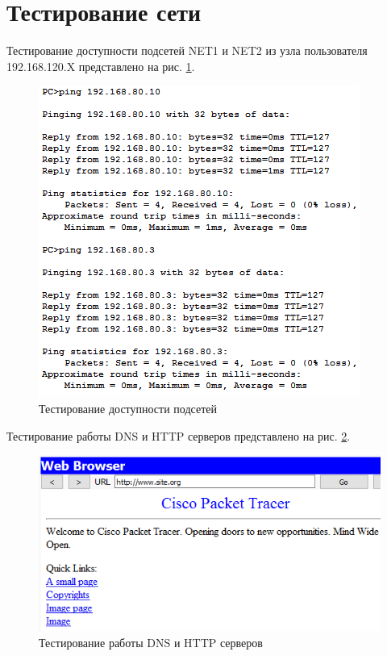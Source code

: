 \section{Тестирование сети}

Тестирование доступности подсетей NET1 и NET2 из узла пользователя 192.168.120.X представлено на рис. \ref{image:6_1}.

\begin{figure}[h!]
	\centering
	\includegraphics[scale = 0.89]{images/6_1.png}
	\caption{Тестирование доступности подсетей}
	\label{image:6_1}
\end{figure}

\clearpage

Тестирование работы DNS и HTTP серверов представлено на рис. \ref{image:6_2}.

\begin{figure}[h!]
	\centering
	\includegraphics[scale = 0.75]{images/6_2.png}
	\caption{Тестирование работы DNS и HTTP серверов}
	\label{image:6_2}
\end{figure}

